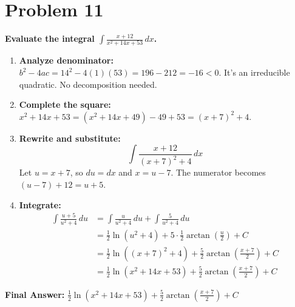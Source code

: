 \documentclass{article}
\begin{document}
\section{Problem 11}
\textbf{Evaluate the integral $\displaystyle\int \frac{x+12}{x^2+14x+53} \,dx$.}
\begin{enumerate}
    \item \textbf{Analyze denominator:} $b^2-4ac = 14^2 - 4(1)(53) = 196-212 = -16 < 0$. It's an irreducible quadratic. No decomposition needed.
    \item \textbf{Complete the square:} $x^2+14x+53 = (x^2+14x+49) - 49 + 53 = (x+7)^2 + 4$.
    \item \textbf{Rewrite and substitute:}
    \[ \int \frac{x+12}{(x+7)^2+4} \,dx \]
    Let $u = x+7$, so $du=dx$ and $x=u-7$. The numerator becomes $(u-7)+12 = u+5$.
    \item \textbf{Integrate:}
    \begin{align*}
    \int \frac{u+5}{u^2+4} \,du &= \int \frac{u}{u^2+4} \,du + \int \frac{5}{u^2+4} \,du \\
    &= \frac{1}{2}\ln(u^2+4) + 5 \cdot \frac{1}{2}\arctan\left(\frac{u}{2}\right) + C \\
    &= \frac{1}{2}\ln((x+7)^2+4) + \frac{5}{2}\arctan\left(\frac{x+7}{2}\right) + C \\
    &= \frac{1}{2}\ln(x^2+14x+53) + \frac{5}{2}\arctan\left(\frac{x+7}{2}\right) + C
    \end{align*}
\end{enumerate}
\textbf{Final Answer:} $\displaystyle\frac{1}{2}\ln(x^2+14x+53) + \frac{5}{2}\arctan\left(\frac{x+7}{2}\right) + C$
\end{document}

